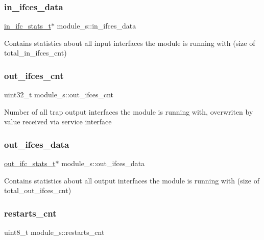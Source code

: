 \subsubsection{\texorpdfstring{in\+\_\+ifces\+\_\+data}{in\_ifces\_data}}
{\footnotesize\ttfamily \hyperlink{structin__ifc__stats__s}{in\+\_\+ifc\+\_\+stats\+\_\+t}$\ast$ module\+\_\+s\+::in\+\_\+ifces\+\_\+data}

Contains statistics about all input interfaces the module is running with (size of total\+\_\+in\+\_\+ifces\+\_\+cnt) \mbox{\label{structmodule__s_a1a4b91fbbd772cb721dd5c14192bcb9b}} 
\subsubsection{\texorpdfstring{out\+\_\+ifces\+\_\+cnt}{out\_ifces\_cnt}}
{\footnotesize\ttfamily uint32\+\_\+t module\+\_\+s\+::out\+\_\+ifces\+\_\+cnt}

Number of all trap output interfaces the module is running with, overwriten by value received via service interface \mbox{\label{structmodule__s_a02c5e701e13b276b4c04de96b9e1da1c}} 
\subsubsection{\texorpdfstring{out\+\_\+ifces\+\_\+data}{out\_ifces\_data}}
{\footnotesize\ttfamily \hyperlink{structout__ifc__stats__s}{out\+\_\+ifc\+\_\+stats\+\_\+t}$\ast$ module\+\_\+s\+::out\+\_\+ifces\+\_\+data}

Contains statistics about all output interfaces the module is running with (size of total\+\_\+out\+\_\+ifces\+\_\+cnt) \mbox{\label{structmodule__s_af58ad81bdb0bdc3396987bbfcf818870}} 
\subsubsection{\texorpdfstring{restarts\+\_\+cnt}{restarts\_cnt}}
{\footnotesize\ttfamily uint8\+\_\+t module\+\_\+s\+::restarts\+\_\+cnt}

